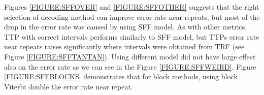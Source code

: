 Figures \ref{FIGURE:SFFOVER} and \ref{FIGURE:SFFOTHER} suggests that the right
selection of decoding method can improve error rate near repeats, but most of
the drop in the error rate was caused by using SFF model. As with other
metrics, TTP with correct intervals performs similarly to SFF model, but TTPs
error rate near repeats raises significantly where intervals were obtained from
TRF (see Figure \ref{FIGURE:SFFTANTAN}). Using different  model did not have
large effect also on the error rate as we can see in the Figure
\ref{FIGURE:SFFWEIRD}. Figure \ref{FIGURE:SFFBLOCKS} demonstrates that for
block methods, using block Viterbi double the error rate near repeat.

